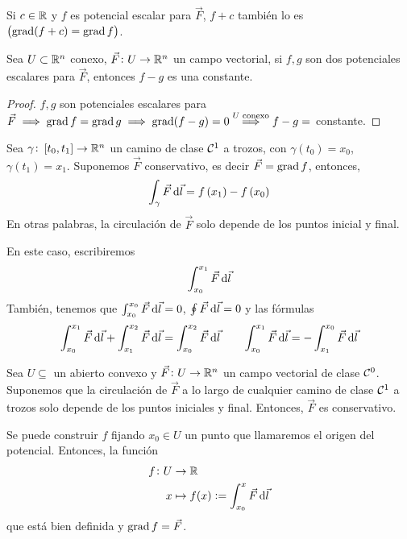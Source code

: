 \begin{obs}
    Si $c \in \mathbb{R}$ y $f$ es potencial escalar para $\vec{F}$, $f+c$ tambi\'en lo es $\left( \operatorname{grad}(f+c)=\operatorname{grad} f \right)$.
\end{obs}

\begin{prop*}
    Sea $U \subset \mathbb{R}^n$ conexo, $\vec{F} \colon U \to \mathbb{R}^n$ un campo vectorial, si $f,g$ son dos potenciales escalares para $\vec{F}$, entonces
    $f - g$ es una constante.
\end{prop*}
\begin{proof}
    $f,g$ son potenciales escalares para $\vec{F} \implies \operatorname{grad} f = \operatorname{grad} g \implies \operatorname{grad} (f-g) = 0 \stackrel{U \text{ conexo}}{\implies} f-g =$ constante.
\end{proof}

\begin{obs}
    Sea $\gamma \colon \left[ t_0, t_1 \right] \to \mathbb{R}^n$ un camino de clase $\mathcal{C}^1$ a trozos, con $\gamma\left( t_0 \right) = x_0$, $\gamma\left( t_1 \right)=x_1$.
    Suponemos $\vec{F}$ conservativo, es decir $\vec{F} = \operatorname{grad} f$, entonces,
    \[
        \int_\gamma \vec{F} \dif \vec{l} = f\left( x_1 \right) - f\left( x_0 \right)
    \]
    En otras palabras, la circulación de $\vec{F}$ solo depende de los puntos inicial y final.
    
    En este caso, escribiremos
    \[
        \int^{x_1}_{x_0} \vec{F} \dif \vec{l}
    \]
    Tambi\'en, tenemos que $\int^{x_0}_{x_0} \vec{F} \dif \vec{l} = 0$, $\oint \vec{F} \dif \vec{l} = 0$ y las fórmulas
    \[
        \int^{x_1}_{x_0} \vec{F} \dif \vec{l} + \int^{x_2}_{x_1} \vec{F} \dif \vec{l} = \int^{x_2}_{x_0} \vec{F} \dif \vec{l}
        \qquad
        \int^{x_1}_{x_0} \vec{F} \dif \vec{l} = - \int^{x_0}_{x_1} \vec{F} \dif \vec{l}
    \]
\end{obs}

\begin{prop}
    Sea $U \subseteq$ un abierto convexo y $\vec{F} \colon U \to \mathbb{R}^n$ un campo vectorial de clase $\mathcal{C}^0$. Suponemos que la circulación de $\vec{F}$
    a lo largo de cualquier camino de clase $\mathcal{C}^1$ a trozos solo depende de los puntos iniciales y final. Entonces, $\vec{F}$ es conservativo.
\end{prop}

\begin{obs*}
    Se puede construir $f$ fijando $x_0 \in U$ un punto que llamaremos el origen del potencial. Entonces, la función
    \[
        \begin{aligned}
            f \colon U &\to \real \\ x &\mapsto f(x) := \int^{x}_{x_0} \vec{F} \dif \vec{l}
        \end{aligned}
    \]
    que está bien definida y $\operatorname{grad} f = \vec{F}$.
\end{obs*}


